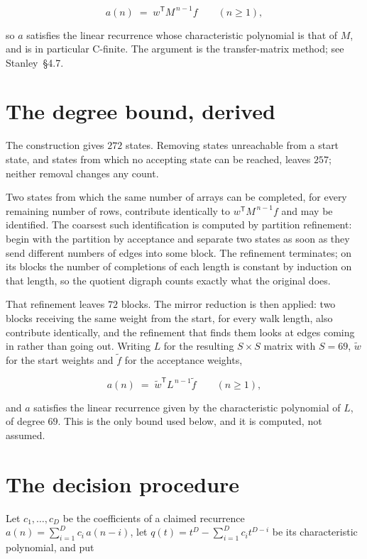 \documentclass[11pt]{article}
\theoremstyle{definition}
\begin{document}
\[a(n) \;=\; w^{\mathsf T} M^{\,n-1} f \qquad (n \ge 1),\]

so $a$ satisfies the linear recurrence whose characteristic polynomial is that of $M$, and is in particular C-finite. The argument is the transfer-matrix method; see Stanley~\S4.7.

\section{The degree bound, derived}

The construction gives $272$ states. Removing states unreachable from a start state, and states from which no accepting state can be reached, leaves $257$; neither removal changes any count.

Two states from which the same number of arrays can be completed, for every remaining number of rows, contribute identically to $w^{\mathsf T}M^{\,n-1}f$ and may be identified. The coarsest such identification is computed by partition refinement: begin with the partition by acceptance and separate two states as soon as they send different numbers of edges into some block. The refinement terminates; on its blocks the number of completions of each length is constant by induction on that length, so the quotient digraph counts exactly what the original does.

That refinement leaves $72$ blocks. The mirror reduction is then applied: two blocks receiving the same weight from the start, for every walk length, also contribute identically, and the refinement that finds them looks at edges coming in rather than going out. Writing $L$ for the resulting $S \times S$ matrix with $S = 69$, $\tilde w$ for the start weights and $\tilde f$ for the acceptance weights,

\[a(n) \;=\; \tilde w^{\mathsf T} L^{\,n-1} \tilde f \qquad (n \ge 1),\]

and $a$ satisfies the linear recurrence given by the characteristic polynomial of $L$, of degree $69$. This is the only bound used below, and it is computed, not assumed.

\section{The decision procedure}

Let $c_1,\dots,c_D$ be the coefficients of a claimed recurrence $a(n) = \sum_{i=1}^{D} c_i\,a(n-i)$, let $q(t) = t^{D} - \sum_{i=1}^{D} c_i t^{D-i}$ be its characteristic polynomial, and put
\end{document}

